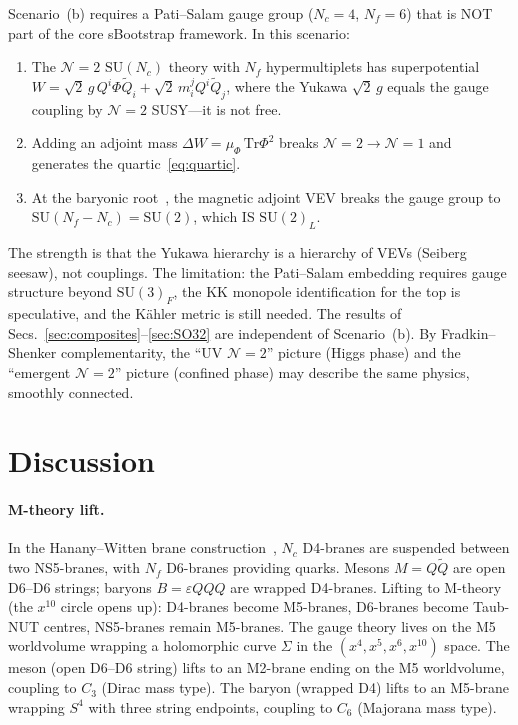 \documentclass[aps,prd,twocolumn,showpacs,preprintnumbers,superscriptaddress,floatfix]{revtex4-2}
\newcommand{\SU}{\mathrm{SU}}
\newcommand{\Nf}{N_{\!f}}
\newcommand{\Nc}{N_{\!c}}
\newcommand{\Tr}{\mathrm{Tr}}
\begin{document}
Scenario~(b) requires a Pati--Salam gauge group ($\Nc = 4$,
$\Nf = 6$) that is NOT part of the core sBootstrap framework.
In this scenario:
\begin{enumerate}
  \item The $\mathcal{N}{=}2$ $\SU(\Nc)$ theory with $\Nf$
    hypermultiplets has superpotential~\cite{HMS:1997,Fayet:1976}
    $W = \sqrt{2}\,g\,Q^i\Phi\tilde{Q}_i + \sqrt{2}\,m^j_i
    Q^i\tilde{Q}_j$, where the Yukawa $\sqrt{2}\,g$ equals the
    gauge coupling by $\mathcal{N}{=}2$ SUSY---it is not free.
  \item Adding an adjoint mass
    $\Delta W = \mu_\Phi\,\Tr\Phi^2$ breaks
    $\mathcal{N}{=}2 \to \mathcal{N}{=}1$ and generates the
    quartic~\eqref{eq:quartic}.
  \item At the baryonic root~\cite{Csaki:2011xn}, the magnetic
    adjoint VEV breaks the gauge group to
    $\SU(\Nf - \Nc) = \SU(2)$, which IS $\SU(2)_L$.
\end{enumerate}
The strength is that the Yukawa hierarchy is a hierarchy of VEVs
(Seiberg seesaw), not couplings.
The limitation: the Pati--Salam embedding requires gauge structure
beyond $\SU(3)_F$, the KK monopole identification for the top is
speculative, and the K\"ahler metric is still needed.
The results of Secs.~\ref{sec:composites}--\ref{sec:SO32}
are independent of Scenario~(b).
By Fradkin--Shenker complementarity, the ``UV $\mathcal{N}{=}2$''
picture (Higgs phase) and the ``emergent $\mathcal{N}{=}2$''
picture (confined phase) may describe the same physics, smoothly
connected.


\section{Discussion}
\label{sec:discussion}

\paragraph{M-theory lift.}
In the Hanany--Witten brane
construction~\cite{HananyWitten:1997}, $\Nc$ D4-branes are
suspended between two NS5-branes, with $\Nf$ D6-branes providing
quarks.
Mesons $M = Q\tilde{Q}$ are open D6--D6 strings; baryons
$B = \varepsilon QQQ$ are wrapped D4-branes.
Lifting to M-theory (the $x^{10}$ circle opens up):
D4-branes become M5-branes, D6-branes become Taub-NUT centres,
NS5-branes remain M5-branes.
The gauge theory lives on the M5 worldvolume wrapping a
holomorphic curve $\Sigma$ in the $(x^4, x^5, x^6, x^{10})$
space.
The meson (open D6--D6 string) lifts to an M2-brane ending on
the M5 worldvolume, coupling to $C_3$ (Dirac mass type).
The baryon (wrapped D4) lifts to an M5-brane wrapping $S^4$
with three string endpoints, coupling to $C_6$ (Majorana mass
type).
\end{document}
